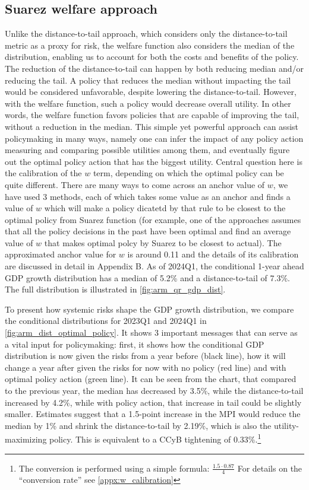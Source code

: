 \documentclass[12pt,a4paper]{article}
\begin{document}
\subsection{Suarez welfare approach}
Unlike the distance-to-tail approach, which considers only the distance-to-tail metric as a proxy for risk, the \citet{suarez2022} welfare function also considers the median of the distribution, enabling us to account for both the costs and benefits of the policy. The reduction of the distance-to-tail can happen by both reducing median and/or reducing the tail. A policy that reduces the median without impacting the tail would be considered unfavorable, despite lowering the distance-to-tail. However, with the welfare function, such a policy would decrease overall utility. In other words, the welfare function favors policies that are capable of improving the tail, without a reduction in the median. 
This simple yet powerful approach can assist policymaking in many ways, namely one can infer the impact of any policy action measuring and comparing possible utilities among them, and eventually figure out the optimal policy action that has the biggest utility. Central question here is the calibration of the $w$ term, depending on which the optimal policy can be quite different. There are many ways to come across an anchor value of $w$, we have used 3 methods, each of which takes some value as an anchor and finds a value of $w$  which will make a policy dicatetd by that rule to be closest to the optimal policy from Suarez function (for example, one of the approaches assumes that all the policy decisions in the past have been optimal and find an average value of $w$ that makes optimal polcy by Suarez to be closest to actual). The approximated anchor value for $w$  is around 0.11 and the details of its calibration are discussed in detail in Appendix B. 
As of 2024Q1, the conditional 1-year ahead GDP growth distribution has a median of 5.2\% and a distance-to-tail of 7.3\%. The full distribution is illustrated in \autoref{fig:arm_qr_gdp_dist}.

To present how systemic risks shape the GDP growth distribution, we compare the conditional distributions for 2023Q1 and 2024Q1 in \autoref{fig:arm_dist_optimal_policy}. It shows 3 important messages that can serve as a vital input for policymaking: first, it shows how the conditional GDP distribution is now given the risks from a year before (black line), how it will change a year after given the risks for now with no policy (red line) and with optimal policy action (green line). It can be seen from the chart, that compared to the previous year, the median has decreased by 3.5\%, while the distance-to-tail increased by 4.2\%, while with policy action, that increase in tail could be slightly smaller. Estimates suggest that a 1.5-point increase in the MPI would reduce the median by 1\% and shrink the distance-to-tail by 2.19\%, which is also the utility-maximizing policy. This is equivalent to a CCyB tightening of 0.33\%.\footnote{The conversion is performed using a simple formula: $\frac{1.5 \cdot 0.87}{4}$ For details on the ``conversion rate'' see \ref{appx:w_calibration}}
\end{document}
